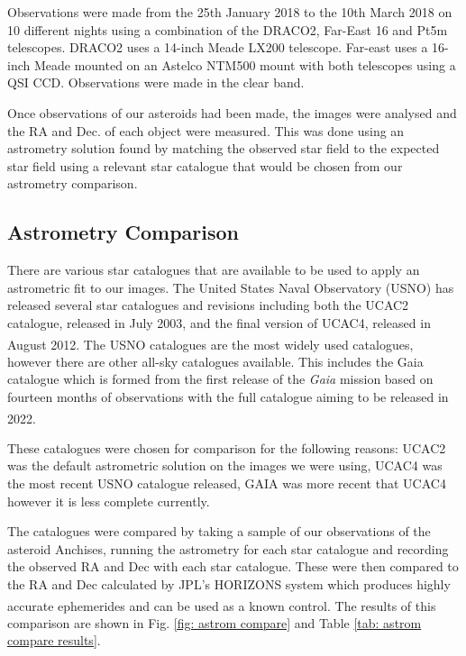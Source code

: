 \documentclass[10pt, twocolumn]{revtex4}    %
\newcommand{\scite}[1]{\textsuperscript{\cite{#1}}}
\begin{document}
Observations were made from the 25th January 2018 to the 10th March 2018 on 10 different nights using a combination of the DRACO2, Far-East 16 and Pt5m telescopes. DRACO2 uses a 14-inch Meade LX200 telescope. Far-east uses a 16-inch Meade mounted on an Astelco NTM500 mount with both telescopes using a QSI CCD. Observations were made in the clear band.

Once observations of our asteroids had been made, the images were analysed and the RA and Dec. of each object were measured. This was done using an astrometry solution found by matching the observed star field to the expected star field using a relevant star catalogue that would be chosen from our astrometry comparison. 

\subsection*{Astrometry Comparison}

There are various star catalogues that are available to be used to apply an astrometric fit to our images. The United States Naval Observatory (USNO) has released several star catalogues and revisions including both the UCAC2 catalogue, released in July 2003, and the final version of UCAC4, released in August 2012.\scite{ZachariassecondUSNaval2004}\scite{ZachariasFourthUSNaval2012} The USNO catalogues are the most widely used catalogues, however there are other all-sky catalogues available. This includes the Gaia catalogue which is formed from the first release of the \textit{Gaia} mission based on fourteen months of observations with the full catalogue aiming to be released in 2022.\scite{GaiaCollaborationGaiaDataRelease2016}

These catalogues were chosen for comparison for the following reasons: UCAC2 was the default astrometric solution on the images we were using, UCAC4 was the most recent USNO catalogue released, GAIA was more recent that UCAC4 however it is less complete currently.

The catalogues were compared by taking a sample of our observations of the asteroid Anchises, running the astrometry for each star catalogue and recording the observed RA and Dec with each star catalogue. These were then compared to the RA and Dec calculated by JPL's HORIZONS system which produces highly accurate ephemerides and can be used as a known control.\scite{HORIZONSSystem} The results of this comparison are shown in Fig. \ref{fig: astrom compare} and Table \ref{tab: astrom compare results}.
\end{document}
